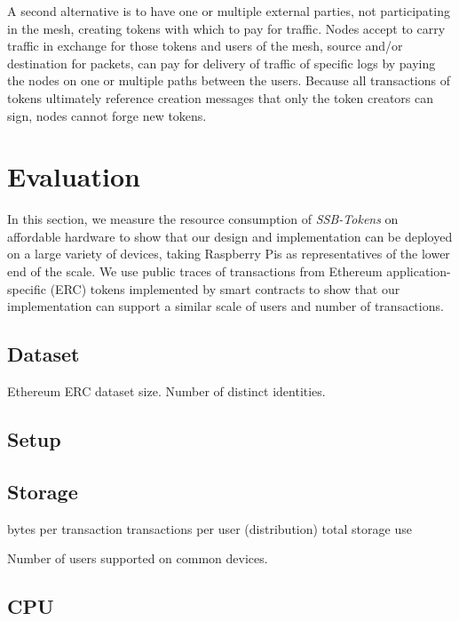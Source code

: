 \documentclass[sigplan,screen,10pt]{acmart}
\newcommand\ssbtokens[0]{\textit{SSB-Tokens} }
\begin{document}
A second alternative is to have one or multiple external parties, not participating in the mesh, creating tokens with which to pay for traffic. Nodes accept to carry traffic in exchange for those tokens and users of the mesh, source and/or destination for packets, can pay for delivery of traffic of specific logs by paying the nodes on one or multiple paths between the users. Because all transactions of tokens ultimately reference creation messages that only the token creators can sign, nodes cannot forge new tokens.

\section{Evaluation}
\label{section:evaluation}

In this section, we measure the resource consumption of \ssbtokens on affordable hardware to show that our design and implementation can be deployed on a large variety of devices, taking Raspberry Pis as representatives of the lower end of the scale. We use public traces of transactions from Ethereum application-specific (ERC) tokens implemented by smart contracts to show that our implementation can support a similar scale of users and number of transactions.

\subsection{Dataset}
\label{section:dataset}

Ethereum ERC dataset size.
Number of distinct identities.



\subsection{Setup}





\subsection{Storage}
\label{section:storage}

bytes per transaction
transactions per user (distribution)
total storage use

Number of users supported on common devices.

\subsection{CPU}
\end{document}
